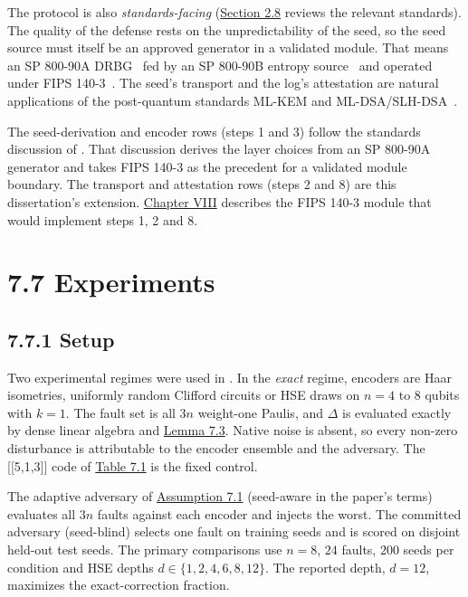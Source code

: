 \documentclass{report}
\theoremstyle{plain}
\theoremstyle{definition}
\theoremstyle{remark}
\begin{document}
The protocol is also \emph{standards-facing} (\hyperref[sec:bg:crypto]{Section 2.8} reviews the relevant standards). The quality of the defense rests on the unpredictability of the seed, so the seed source must itself be an approved generator in a validated module. That means an SP 800-90A DRBG~\cite{nist2015sp80090a} fed by an SP 800-90B entropy source~\cite{nist2018sp80090b} and operated under FIPS 140-3~\cite{nist2019fips1403}. The seed's transport and the log's attestation are natural applications of the post-quantum standards ML-KEM and ML-DSA/SLH-DSA~\cite{nist2024fips203,nist2024fips204,nist2024fips205}.

The seed-derivation and encoder rows (steps 1 and 3) follow the standards discussion of \cite{guo2026qecaudit}. That discussion derives the layer choices from an SP 800-90A generator and takes FIPS 140-3 as the precedent for a validated module boundary. The transport and attestation rows (steps 2 and 8) are this dissertation's extension. \hyperref[ch:pqc]{Chapter VIII} describes the FIPS 140-3 module that would implement steps 1, 2 and 8.

\section{7.7 Experiments}\label{sec:qec:experiments}

\subsection{7.7.1 Setup}\label{sec:qec:setup}

Two experimental regimes were used in \cite{guo2026qecaudit}. In the \emph{exact} regime, encoders are Haar isometries, uniformly random Clifford circuits or HSE draws on $n=4$ to $8$ qubits with $k=1$. The fault set is all $3n$ weight-one Paulis, and $\Delta$ is evaluated exactly by dense linear algebra and \hyperref[lem:qec:indicator]{Lemma 7.3}. Native noise is absent, so every non-zero disturbance is attributable to the encoder ensemble and the adversary. The [[5,1,3]] code of \hyperref[tab:qec:code513]{Table 7.1} is the fixed control.

The adaptive adversary of \hyperref[ass:qec:model]{Assumption 7.1} (seed-aware in the paper's terms) evaluates all $3n$ faults against each encoder and injects the worst. The committed adversary (seed-blind) selects one fault on training seeds and is scored on disjoint held-out test seeds. The primary comparisons use $n=8$, $24$ faults, $200$ seeds per condition and HSE depths $d\in\{1,2,4,6,8,12\}$. The reported depth, $d=12$, maximizes the exact-correction fraction.
\end{document}
